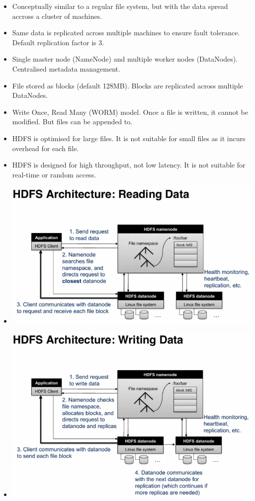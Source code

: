 \documentclass[10pt, landscape]{article}
\begin{document}
\begin{multicols*}{4}
  \begin{itemize}
    \item Conceptually similar to a regular file system, but with the data spread accross a cluster of machines.
    \item Same data is replicated across multiple machines to ensure fault tolerance. Default replication factor is 3.
    \item Single master node (NameNode) and multiple worker nodes (DataNodes). Centralised metadata management.
    \item File stored as blocks (default 128MB). Blocks are replicated across multiple DataNodes.
    \item Write Once, Read Many (WORM) model. Once a file is written, it cannot be modified. But files can be appended to.
    \item HDFS is optimised for large files. It is not suitable for small files as it incurs overhead for each file.
    \item HDFS is designed for high throughput, not low latency. It is not suitable for real-time or random access.
    \item \includegraphics[width=0.95\linewidth]{hdfs_reading_data.png}
    \item \includegraphics[width=0.95\linewidth]{hdfs_writing_data.png}

\end{itemize}
\end{multicols*}
\end{document}
